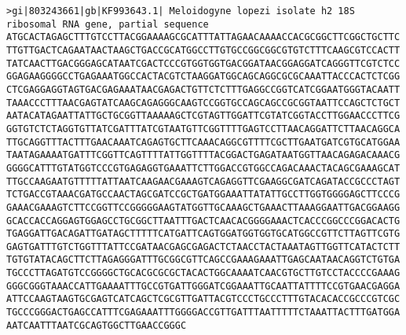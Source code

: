 \documentclass[11pt]{article}
\begin{document}
\begin{Verbatim}[commandchars=\\\{\}]
>gi|803243661|gb|KF993643.1| Meloidogyne lopezi isolate h2 18S ribosomal RNA gene, partial sequence
ATGCACTAGAGCTTTGTCCTTACGGAAAAGCGCATTTATTAGAACAAAACCACGCGGCTTCGGCTGCTTC
TTGTTGACTCAGAATAACTAAGCTGACCGCATGGCCTTGTGCCGGCGGCGTGTCTTTCAAGCGTCCACTT
TATCAACTTGACGGGAGCATAATCGACTCCCGTGGTGGTGACGGATAACGGAGGATCAGGGTTCGTCTCC
GGAGAAGGGGCCTGAGAAATGGCCACTACGTCTAAGGATGGCAGCAGGCGCGCAAATTACCCACTCTCGG
CTCGAGGAGGTAGTGACGAGAAATAACGAGACTGTTCTCTTTGAGGCCGGTCATCGGAATGGGTACAATT
TAAACCCTTTAACGAGTATCAAGCAGAGGGCAAGTCCGGTGCCAGCAGCCGCGGTAATTCCAGCTCTGCT
AATACATAGAATTATTGCTGCGGTTAAAAAGCTCGTAGTTGGATTCGTATCGGTACCTTGGAACCCTTCG
GGTGTCTCTAGGTGTTATCGATTTATCGTAATGTTCGGTTTTGAGTCCTTAACAGGATTCTTAACAGGCA
TTGCAGGTTTACTTTGAACAAATCAGAGTGCTTCAAACAGGCGTTTTCGCTTGAATGATCGTGCATGGAA
TAATAGAAAATGATTTCGGTTCAGTTTTATTGGTTTTACGGACTGAGATAATGGTTAACAGAGACAAACG
GGGGCATTTGTATGGTCCCGTGAGAGGTGAAATTCTTGGACCGTGGCCAGACAAACTACAGCGAAAGCAT
TTGCCAAGAATGTTTTTATTAATCAAGAACGAAAGTCAGAGGTTCGAAGGCGATCAGATACCGCCCTAGT
TCTGACCGTAAACGATGCCAACTAGCGATCCGCTGATGGAAATTATATTGCCTTGGTGGGGAGCTTCCCG
GAAACGAAAGTCTTCCGGTTCCGGGGGAAGTATGGTTGCAAAGCTGAAACTTAAAGGAATTGACGGAAGG
GCACCACCAGGAGTGGAGCCTGCGGCTTAATTTGACTCAACACGGGGAAACTCACCCGGCCCGGACACTG
TGAGGATTGACAGATTGATAGCTTTTTCATGATTCAGTGGATGGTGGTGCATGGCCGTTCTTAGTTCGTG
GAGTGATTTGTCTGGTTTATTCCGATAACGAGCGAGACTCTAACCTACTAAATAGTTGGTTCATACTCTT
TGTGTATACAGCTTCTTAGAGGGATTTGCGGCGTTCAGCCGAAAGAAATTGAGCAATAACAGGTCTGTGA
TGCCCTTAGATGTCCGGGGCTGCACGCGCGCTACACTGGCAAAATCAACGTGCTTGTCCTACCCCGAAAG
GGGCGGGTAAACCATTGAAAATTTGCCGTGATTGGGATCGGAAATTGCAATTATTTTCCGTGAACGAGGA
ATTCCAAGTAAGTGCGAGTCATCAGCTCGCGTTGATTACGTCCCTGCCCTTTGTACACACCGCCCGTCGC
TGCCCGGGACTGAGCCATTTCGAGAAATTTGGGGACCGTTGATTTAATTTTTCTAAATTACTTTGATGGA
AATCAATTTAATCGCAGTGGCTTGAACCGGGC


\end{Verbatim}
\end{document}
